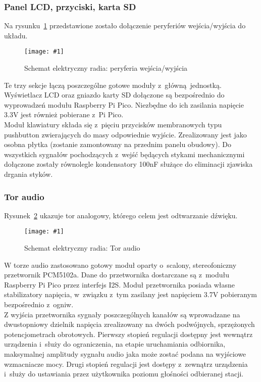 \documentclass[polish]{aghengthesis}
\newcommand{\imgint}[4]{
	\begin{figure}[{#4}]
		\centering
		\texttt{[image: \#1]}
		\caption{#2}
		\label{#1}
	\end{figure}
}
\newcommand{\imgh}[3]{\imgint{#1}{#2}{#3}{H}}
\begin{document}
			\subsubsection{Panel LCD, przyciski, karta SD}
				Na rysunku~\ref{3/hw_kicad_sch_perip} przedstawione zostało dołączenie peryferiów wejścia/wyjścia do układu.
				\imgh{3/hw_kicad_sch_perip}{Schemat elektryczny radia: peryferia wejścia/wyjścia}{0.95}
				
				Te trzy sekcje łączą poszczególne gotowe moduły z~główną jednostką.
				Wyświetlacz LCD oraz gniazdo karty SD dołączone są bezpośrednio do wyprowadzeń modułu Raspberry Pi Pico. Niezbędne do ich zasilania napięcie 3.3V jest również pobierane z~Pi Pico.
				$ $\\
				
				Moduł klawiatury składa się z~pięciu przycisków membranowych typu pushbutton zwierających do masy odpowiednie wyjście. Zrealizowany jest jako osobna płytka (zostanie zamontowany na przednim panelu obudowy).  Do wszystkich sygnałów pochodzących z~wejść będących stykami mechanicznymi dołączone zostały równolegle kondensatory 100nF służące do eliminacji zjawiska drgania styków.
				\pagebreak
				
			\subsubsection{Tor audio}
				Rysunek~\ref{3/hw_kicad_sch_audio} ukazuje tor analogowy, którego celem jest odtwarzanie dźwięku.
				\imgh{3/hw_kicad_sch_audio}{Schemat elektryczny radia: Tor audio}{0.95}
				
				W torze audio zastosowano gotowy moduł oparty o~scalony, stereofoniczny przetwornik PCM5102a\textsuperscript{\cite{hw_dac}}. Dane do przetwornika dostarczane są z~modułu Raspberry Pi Pico przez interfejs I2S. Moduł przetwornika posiada własne stabilizatory napięcia, w~związku z~tym zasilany jest napięciem 3.7V pobieranym bezpośrednio z~ogniw.
				$ $\\
				
				Z wyjścia przetwornika sygnały poszczególnych kanałów są wprowadzane na dwustopniowy dzielnik napięcia zrealizowany na dwóch podwójnych, sprzężonych potencjometrach obrotowych. Pierwszy stopień regulacji dostępny jest wewnątrz urządzenia i~służy do ograniczenia, na etapie uruchamiania odbiornika, maksymalnej amplitudy sygnału audio jaka może zostać podana na wyjściowe wzmacniacze mocy. Drugi stopień regulacji jest dostępy z~zewnątrz urządzenia i~służy do ustawiania przez użytkownika poziomu głośności odbieranej stacji. 
				$ $\\
				
\end{document}
